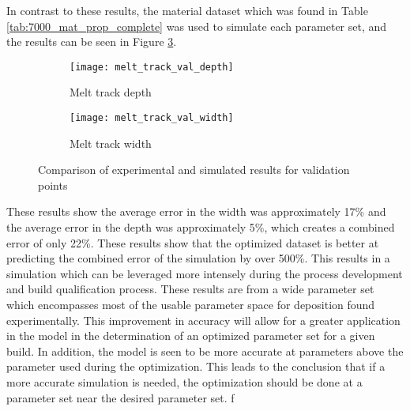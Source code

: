 In contrast to these results, the material dataset which was found in Table \ref{tab:7000_mat_prop_complete} was used to simulate each parameter set, and the results can be seen in Figure \ref{fig:melt_track_val}.
\begin{figure}[!htb]\centering
	\begin{subfigure}[c]{0.45\textwidth}\centering
	\texttt{[image: melt\_track\_val\_depth]}
	\caption{Melt track depth}
	\label{fig:melt_track_val_depth}
	\end{subfigure}\hfill{}
		\begin{subfigure}[c]{0.45\textwidth}\centering
		\texttt{[image: melt\_track\_val\_width]}
		\caption{Melt track width}
		\label{fig:melt_track_val_width}
		\end{subfigure}
	\caption{Comparison of experimental and simulated results for validation points}
	\label{fig:melt_track_val}
\end{figure}
These results show the average error in the width was approximately 17\% and the average error in the depth was approximately 5\%, which creates a combined error of only 22\%.  These results show that the optimized dataset is better at predicting the combined error of the simulation by over 500\%.  This results in a simulation which can be leveraged more intensely during the process development and build qualification process.  
These results are from a wide parameter set which encompasses most of the usable parameter space for deposition found experimentally.  This improvement in accuracy will allow for a greater application in the model in the determination of an optimized parameter set for a given build.  In addition, the model is seen to be more accurate at parameters above the parameter used during the optimization.  This leads to the conclusion that if a more accurate simulation is needed, the optimization should be done at a parameter set near the desired parameter set.  f